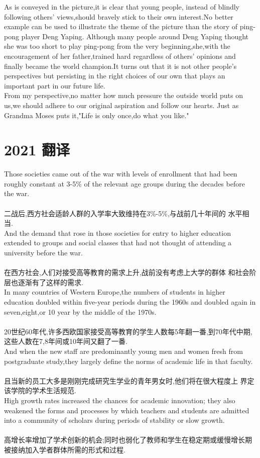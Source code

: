 \documentclass[UTF8]{article}
\begin{document}
    As is conveyed in the picture,it is clear that young people,
    instead of blindly following others' views,should bravely stick 
    to their own interest.No better example can be used to illustrate the 
    theme of the picture than the story of ping-pong player Deng Yaping.
    Although many people around Deng Yaping thought she was too short 
    to play ping-pong from the very beginning,she,with the encouragement 
    of her father,trained hard regardless of others' opinions and finally 
    became the world champion.It turns out that it is not other people's 
    perspectives but persisting in the right choices of our own that plays 
    an important part in our future life.\\
    From my perspective,no matter how much pressure the outside world puts 
    on us,we should adhere to our original aspiration and follow our hearts.
    Just as Grandma Moses puts it,"Life is only once,do what you like."
    \section*{2021 翻译}
    Those societies came out of the war with levels of enrollment that 
    had been roughly constant at 3-5\% of the relevant age groups during 
    the decades before the war.\\
    \\
    二战后,西方社会适龄人群的入学率大致维持在3\%-5\%,与战前几十年间的
    水平相当.
    \\
    And the demand that rose in those societies for entry to higher 
    education extended to groups and social classes that had not 
    thought of attending a university before the war.\\
    \\
    在西方社会,人们对接受高等教育的需求上升,战前没有考虑上大学的群体
    和社会阶层也逐渐有了这样的需求.
    \\
    In many countries of Western Europe,the numbers of students in 
    higher education doubled within five-year periods during the 
    1960s and doubled again in seven,eight,or 10 year by the middle 
    of the 1970s.\\
    \\
    20世纪60年代,许多西欧国家接受高等教育的学生人数每5年翻一番,到70年代中期,
    这些人数在7,8年间或10年间又翻了一番.
    \\
    And when the new staff are predominantly young men and women fresh 
    from postgraduate study,they largely define the norms of academic 
    life in that faculty.\\
    \\
    且当新的员工大多是刚刚完成研究生学业的青年男女时,他们将在很大程度上
    界定该学院的学术生活规范.
    \\
    High growth rates increased the chances for academic innovation;
    they also weakened the forms and processes by which teachers and 
    students are admitted into a community of scholars during periods 
    of stability or slow growth.\\
    \\
    高增长率增加了学术创新的机会;同时也弱化了教师和学生在稳定期或缓慢增长期
    被接纳加入学者群体所需的形式和过程.
\end{document}
